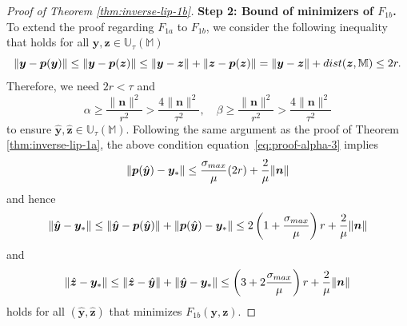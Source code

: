\documentclass[10pt,a4paper]{amsart}
\def\eqref#1{equation~\ref{#1}}
\def\sM{{\mathbb{M}}}
\def\sU{{\mathbb{U}}}
\def\vn{{\bm{n}}}
\def\vp{{\bm{p}}}
\def\vy{{\bm{y}}}
\def\vz{{\bm{z}}}
\begin{document}
\begin{proof}[Proof of Theorem \ref{thm:inverse-lip-1b}]
\textbf{Step 2: Bound of minimizers of $F_{1b}$.} To extend the proof regarding $F_{1a}$ to $F_{1b}$, we consider the following inequality that holds for all $\vy,\vz \in \sU_{\tau}(\sM)$
\[ \|\vy-\vp(\vy)\| \leq \|\vy-\vp(\vz)\| \leq \|\vy-\vz\| + \|\vz-\vp(\vz)\| = \|\vy-\vz\| + \textup{dist}(\vz,\sM) \leq 2r. \]
Therefore, we need $2r < \tau$ and
\begin{equation}
\label{eq:proof-alpha-3}
  \alpha \geq \frac{\|\vn\|^2}{r^2} > \frac{4\|\vn\|^2}{\tau^2}, \quad \beta \geq \frac{\|\vn\|^2}{r^2}  > \frac{4\|\vn\|^2}{\tau^2} 
\end{equation}
to ensure $\hat{\vy},\hat{\vz} \in \sU_{\tau}(\sM)$. Following the same argument as the proof of Theorem \ref{thm:inverse-lip-1a}, the above condition \eqref{eq:proof-alpha-3} implies
\[
\|\vp(\hat{\vy}) - \vy_\ast \| \leq \frac{\sigma_{\textup{max}}}{\mu} (2r) + \frac{2}{\mu} \|\vn\| 
\]
and hence
\begin{equation}
\label{eq:proof-error-bound-1b}
\|\hat{\vy} - \vy_\ast\| \leq \|\hat{\vy} - \vp(\hat{\vy}) \| + \|\vp(\hat{\vy}) - \vy_\ast \| \leq 2 \left(1 + \frac{\sigma_{\textup{max}}}{\mu} \right) r + \frac{2}{\mu} \|\vn\|
\end{equation}
and
\begin{equation}
\label{eq:proof-error-bound-1b-z}
\|\hat{\vz} - \vy_\ast\| \leq \|\hat{\vz} - \hat{\vy} \| + \|\hat{\vy} - \vy_\ast \| \leq \left(3 + 2 \frac{\sigma_{\textup{max}}}{\mu} \right) r + \frac{2}{\mu} \|\vn\|
\end{equation}
holds for all $(\hat{\vy},\hat{\vz})$ that minimizes $F_{1b}(\vy,\vz)$.


\end{proof}
\end{document}
